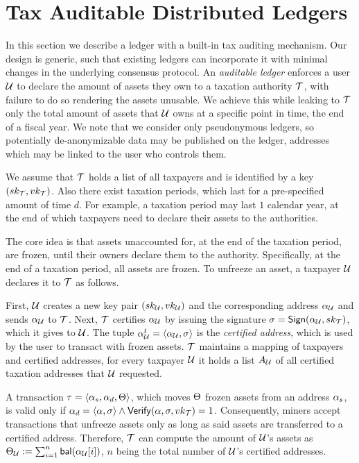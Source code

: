\section{Tax Auditable Distributed Ledgers}\label{sec:taxchain}

In this section we describe a ledger with a built-in tax auditing mechanism.
Our design is generic, such that existing ledgers can incorporate it with
minimal changes in the underlying consensus protocol. An \emph{auditable
ledger} enforces a user $\mathcal{U}$ to declare the amount of assets they own to a
taxation authority $\mathcal{T}$, with failure to do so rendering the assets
unusable. We achieve this while leaking to $\mathcal{T}$ only the total amount of
assets that $\mathcal{U}$ owns at a specific point in time, \eg the end of a fiscal
year. We note that we consider only pseudonymous ledgers, so potentially
de-anonymizable data may be published on the ledger, \eg addresses which may be
linked to the user who controls them.

We assume that $\mathcal{T}$ holds a list of all taxpayers and is identified by a
key $(sk_{\mathcal{T}}, vk_{\mathcal{T}})$. Also there exist taxation
periods, which last for a pre-specified amount of time $d$. For example, a
taxation period may last $1$ calendar year, at the end of which taxpayers need
to declare their assets to the authorities.

The core idea is that assets unaccounted for, at the end of the taxation
period, are frozen, until their owners declare them to the authority.
Specifically, at the end of a taxation period, all assets are frozen. To
unfreeze an asset, a taxpayer $\mathcal{U}$ declares it to $\mathcal{T}$ as follows.

First, $\mathcal{U}$ creates a new key pair $(sk_{\mathcal{U}}, vk_{\mathcal{U}})$
and the corresponding address $\alpha_{\mathcal{U}}$ and sends $\alpha_{\mathcal{U}}$
to $\mathcal{T}$.  Next, $\mathcal{T}$ certifies $\alpha_{\mathcal{U}}$ by issuing the
signature $\sigma = \mathsf{Sign}(\alpha_{\mathcal{U}}, sk_{\mathcal{T}})$, which it
gives to $\mathcal{U}$. The tuple $\alpha_{\mathcal{U}}^{t} = \langle \alpha_{\mathcal{U}},
\sigma \rangle$ is the \emph{certified address}, which is used by the user to
transact with frozen assets. $\mathcal{T}$ maintains a mapping of taxpayers and
certified addresses, \ie for every taxpayer $\mathcal{U}$ it holds a list $A_\mathcal{U}$
of all certified taxation addresses that $\mathcal{U}$ requested.

A transaction $\tau = \langle \alpha_{s}, \alpha_{d}, \Theta \rangle$,
which moves $\Theta$ frozen assets from an address $\alpha_{s}$, is valid
only if $\alpha_{d} = \langle \alpha, \sigma \rangle \land
\mathsf{Verify}(\alpha, \sigma, vk_{\mathcal{T}}) = 1$. Consequently, miners
accept transactions that unfreeze assets only as long as said assets are
transferred to a certified address. Therefore, $\mathcal{T}$ can compute the
amount of $\mathcal{U}$'s assets as $\Theta_\mathcal{U} := \sum_{i=1}^{n}
\mathsf{bal}(\alpha_{\mathcal{U}}[i])$, $n$ being the total number of $\mathcal{U}$'s
certified addresses.

